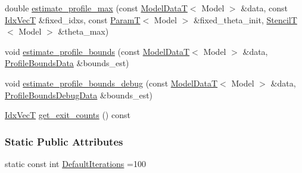 {\bf }\par
\begin{DoxyCompactItemize}
\item 
double \hyperlink{classmappel_1_1estimator_1_1Estimator_aaadd90fa484e5becd980d2c3e268c97b}{estimate\+\_\+profile\+\_\+max} (const \hyperlink{namespacemappel_a97f050df953605381ae9c901c3b125f1}{Model\+DataT}$<$ Model $>$ \&data, const \hyperlink{namespacemappel_ac63743dcd42180127307cd0e4ecdd784}{Idx\+VecT} \&fixed\+\_\+idxs, const \hyperlink{namespacemappel_a667925cb0d6c0e49f2f035cc5a9a6857}{ParamT}$<$ Model $>$ \&fixed\+\_\+theta\+\_\+init, \hyperlink{namespacemappel_a3a06598240007876f8c4bf834ad86197}{StencilT}$<$ Model $>$ \&theta\+\_\+max)
\end{DoxyCompactItemize}

{\bf }\par
\begin{DoxyCompactItemize}
\item 
void \hyperlink{classmappel_1_1estimator_1_1Estimator_a9efcc3adb2fd64ab75c8954ab29687fc}{estimate\+\_\+profile\+\_\+bounds} (const \hyperlink{namespacemappel_a97f050df953605381ae9c901c3b125f1}{Model\+DataT}$<$ Model $>$ \&data, \hyperlink{structmappel_1_1estimator_1_1ProfileBoundsData}{Profile\+Bounds\+Data} \&bounds\+\_\+est)
\item 
void \hyperlink{classmappel_1_1estimator_1_1Estimator_a67b7910edb97973def5636ed01c3be5f}{estimate\+\_\+profile\+\_\+bounds\+\_\+debug} (const \hyperlink{namespacemappel_a97f050df953605381ae9c901c3b125f1}{Model\+DataT}$<$ Model $>$ \&data, \hyperlink{namespacemappel_1_1estimator_structmappel_1_1estimator_1_1ProfileBoundsDebugData}{Profile\+Bounds\+Debug\+Data} \&bounds\+\_\+est)
\end{DoxyCompactItemize}

{\bf }\par
\begin{DoxyCompactItemize}
\item 
\hyperlink{namespacemappel_ac63743dcd42180127307cd0e4ecdd784}{Idx\+VecT} \hyperlink{classmappel_1_1estimator_1_1Estimator_adde56d397f57f6f4f2d4f10fc59f7a08}{get\+\_\+exit\+\_\+counts} () const 
\end{DoxyCompactItemize}

\subsubsection*{Static Public Attributes}
\begin{DoxyCompactItemize}
\item 
static const int \hyperlink{classmappel_1_1estimator_1_1IterativeMaximizer_ab66c01c2eee630f3fca119f3fe09a19a}{Default\+Iterations} =100
\end{DoxyCompactItemize}
